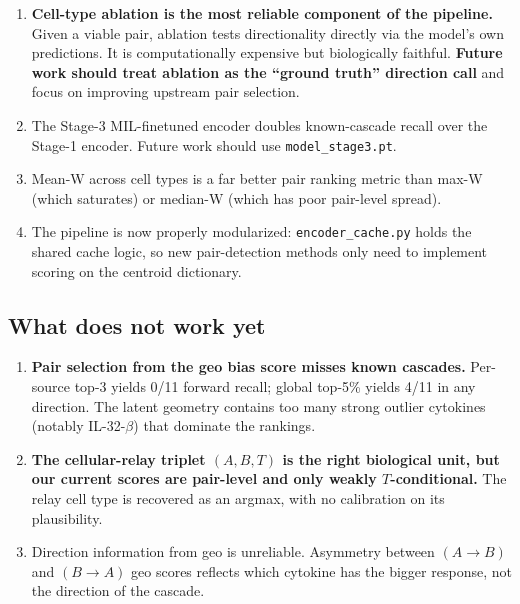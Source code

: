 \documentclass[11pt,a4paper]{article}
\newcommand{\codeword}[1]{\texttt{\small #1}}
\newcommand{\KEY}[1]{\textbf{\color{tablehead}#1}}
\begin{document}
\begin{enumerate}[label=\textbf{C\arabic*.},leftmargin=*]
\item \KEY{Cell-type ablation is the most reliable component of the
pipeline.} Given a viable pair, ablation tests directionality directly
via the model's own predictions. It is computationally expensive but
biologically faithful. \textbf{Future work should treat ablation as the
``ground truth'' direction call} and focus on improving upstream pair
selection.

\item The Stage-3 MIL-finetuned encoder doubles known-cascade recall
over the Stage-1 encoder. Future work should use \codeword{model\_stage3.pt}.

\item Mean-W across cell types is a far better pair ranking metric
than max-W (which saturates) or median-W (which has poor pair-level
spread).

\item The pipeline is now properly modularized: \codeword{encoder\_cache.py}
holds the shared cache logic, so new pair-detection methods only need
to implement scoring on the centroid dictionary.
\end{enumerate}

\subsection{What does not work yet}

\begin{enumerate}[label=\textbf{X\arabic*.},leftmargin=*]
\item \KEY{Pair selection from the geo bias score misses known cascades.}
Per-source top-3 yields 0/11 forward recall; global top-5\% yields 4/11
in any direction. The latent geometry contains too many strong outlier
cytokines (notably IL-32-$\beta$) that dominate the rankings.

\item \KEY{The cellular-relay triplet $(A, B, T)$ is the right
biological unit, but our current scores are pair-level and only weakly
$T$-conditional.} The relay cell type is recovered as an argmax, with
no calibration on its plausibility.

\item Direction information from geo is unreliable. Asymmetry between
$(A \to B)$ and $(B \to A)$ geo scores reflects which cytokine has the
bigger response, not the direction of the cascade.
\end{enumerate}
\end{document}
